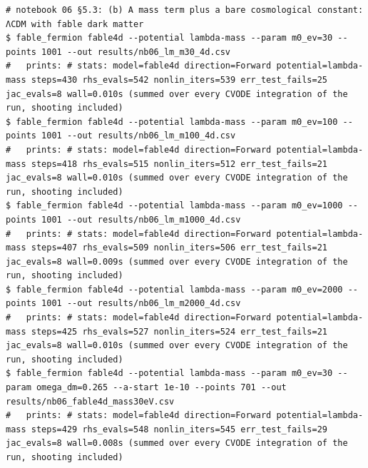\begin{Verbatim}
# notebook 06 §5.3: (b) A mass term plus a bare cosmological constant: ΛCDM with fable dark matter
$ fable_fermion fable4d --potential lambda-mass --param m0_ev=30 --points 1001 --out results/nb06_lm_m30_4d.csv
#   prints: # stats: model=fable4d direction=Forward potential=lambda-mass steps=430 rhs_evals=542 nonlin_iters=539 err_test_fails=25 jac_evals=8 wall=0.010s (summed over every CVODE integration of the run, shooting included)
$ fable_fermion fable4d --potential lambda-mass --param m0_ev=100 --points 1001 --out results/nb06_lm_m100_4d.csv
#   prints: # stats: model=fable4d direction=Forward potential=lambda-mass steps=418 rhs_evals=515 nonlin_iters=512 err_test_fails=21 jac_evals=8 wall=0.010s (summed over every CVODE integration of the run, shooting included)
$ fable_fermion fable4d --potential lambda-mass --param m0_ev=1000 --points 1001 --out results/nb06_lm_m1000_4d.csv
#   prints: # stats: model=fable4d direction=Forward potential=lambda-mass steps=407 rhs_evals=509 nonlin_iters=506 err_test_fails=21 jac_evals=8 wall=0.009s (summed over every CVODE integration of the run, shooting included)
$ fable_fermion fable4d --potential lambda-mass --param m0_ev=2000 --points 1001 --out results/nb06_lm_m2000_4d.csv
#   prints: # stats: model=fable4d direction=Forward potential=lambda-mass steps=425 rhs_evals=527 nonlin_iters=524 err_test_fails=21 jac_evals=8 wall=0.010s (summed over every CVODE integration of the run, shooting included)
$ fable_fermion fable4d --potential lambda-mass --param m0_ev=30 --param omega_dm=0.265 --a-start 1e-10 --points 701 --out results/nb06_fable4d_mass30eV.csv
#   prints: # stats: model=fable4d direction=Forward potential=lambda-mass steps=429 rhs_evals=548 nonlin_iters=545 err_test_fails=29 jac_evals=8 wall=0.008s (summed over every CVODE integration of the run, shooting included)


\end{Verbatim}
